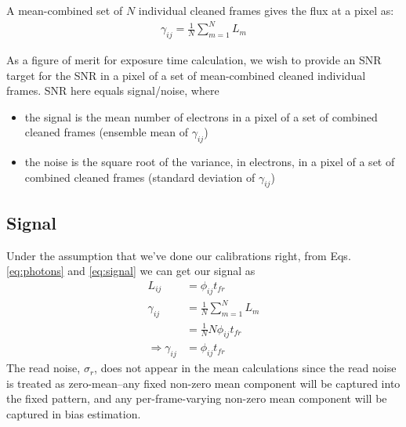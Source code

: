 \documentclass{article}
\begin{document}
A mean-combined set of $N$ individual cleaned frames gives the flux at a pixel as:
\begin{align}
\gamma_{ij} = \frac{1}{N} \sum_{m=1}^{N} L_{m}
\end{align}

As a figure of merit for exposure time calculation, we wish to provide an SNR target for the SNR in a pixel of a set of mean-combined cleaned individual frames.  SNR here equals signal/noise, where
\begin{itemize}
\item the signal is the mean number of electrons in a pixel of a set of combined cleaned frames (ensemble mean of $\gamma_{ij}$)
\item the noise is the square root of the variance, in electrons, in a pixel of a set of combined cleaned frames (standard deviation of $\gamma_{ij}$)
\end{itemize}

\subsection{Signal}

Under the assumption that we've done our calibrations right, from Eqs. \ref{eq:photons} and \ref{eq:signal} we can get our signal as
\begin{align}
L_{ij} &= \phi_{ij} t_{fr} \\
\gamma_{ij} &= \frac{1}{N} \sum_{m=1}^{N} L_{m} \nonumber\\
&= \frac{1}{N} N \phi_{ij} t_{fr} \nonumber \\
\Rightarrow \gamma_{ij} &= \phi_{ij} t_{fr}
\end{align}
The read noise, $\sigma_{r}$, does not appear in the mean calculations since the read noise is treated as zero-mean--any fixed non-zero mean component will be captured into the fixed pattern, and any per-frame-varying non-zero mean component will be captured in bias estimation.
\end{document}
